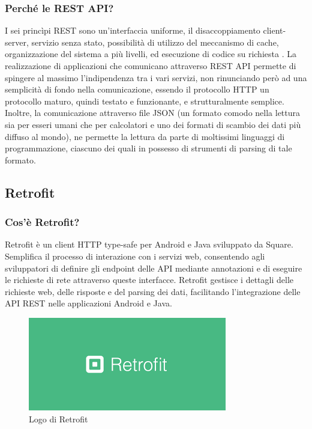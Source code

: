             \subsubsection{Perché le REST API?}
                I sei princìpi REST sono un'interfaccia uniforme, il disaccoppiamento client-server, servizio senza stato, possibilità di utilizzo del meccanismo di cache, organizzazione del sistema a più livelli, ed esecuzione di codice su richiesta \cite{IBM1}. La realizzazione di applicazioni che comunicano attraverso REST API permette di spingere al massimo l'indipendenza tra i vari servizi, non rinunciando però ad una semplicità di fondo nella comunicazione, essendo il protocollo HTTP un protocollo maturo, quindi testato e funzionante, e strutturalmente semplice. Inoltre, la comunicazione attraverso file JSON (un formato comodo nella lettura sia per esseri umani che per calcolatori e uno dei formati di scambio dei dati più diffuso al mondo), ne permette la lettura da parte di moltissimi linguaggi di programmazione, ciascuno dei quali in possesso di strumenti di parsing di tale formato.

        \subsection{Retrofit}
            \subsubsection{Cos'è Retrofit?}
                Retrofit è un client HTTP type-safe per Android e Java sviluppato da Square. Semplifica il processo di interazione con i servizi web, consentendo agli sviluppatori di definire gli endpoint delle API mediante annotazioni e di eseguire le richieste di rete attraverso queste interfacce. Retrofit gestisce i dettagli delle richieste web, delle risposte e del parsing dei dati, facilitando l'integrazione delle API REST nelle applicazioni Android e Java.
            \begin{figure}[htbp!]
                \centering
                \includegraphics[width=0.5\linewidth]{Immagini/System Design/Retrofit.png}
                \caption{Logo di Retrofit}
            \end{figure}
            
